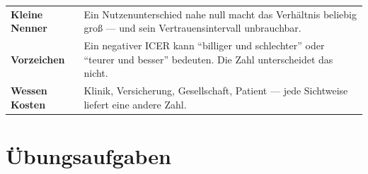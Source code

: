 \begin{warnung}
\begin{center}
{\small
\renewcommand{\arraystretch}{1.52}
\begin{tabular}{@{}P{2.6cm}P{6.0cm}@{}}
\toprule
\textbf{Kleine Nenner} & Ein Nutzenunterschied nahe null macht das Verhältnis beliebig groß --- und sein Vertrauensintervall unbrauchbar.\\
\textbf{Vorzeichen} & Ein negativer ICER kann \enquote{billiger und schlechter} oder \enquote{teurer und besser} bedeuten. Die Zahl unterscheidet das nicht.\\
\textbf{Wessen Kosten} & Klinik, Versicherung, Gesellschaft, Patient --- jede Sichtweise liefert eine andere Zahl.\\
\bottomrule
\end{tabular}}
\end{center}

\begin{center}
\begin{minipage}{0.88\textwidth}
\end{minipage}
\end{center}
\end{warnung}

\section{Übungsaufgaben}

